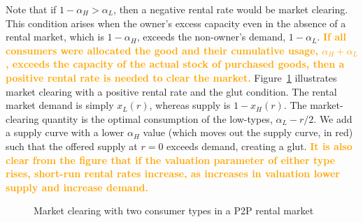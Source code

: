 \documentclass[11pt]{article}
\newcommand{\important}[1]{\textcolor{orange}{\textbf{#1}}}
\newcommand{\important}[1]{#1}
\begin{document}
Note that if $1-\alpha_H > \alpha_L$, then a negative rental rate would be market clearing. 
This condition arises when the owner's excess capacity even in the
absence of a rental market, which is $1-\alpha_H$, exceeds the non-owner's demand, $1-\alpha_L$.
\important{If all consumers were allocated the good and their cumulative usage, $\alpha_H + \alpha_L$, exceeds the capacity of the actual stock of purchased goods, then a positive rental rate is needed to clear the market.}
Figure~\ref{fig:market_clearing} illustrates market clearing with a positive rental rate and the glut condition. 
The rental market demand is simply $x_L(r)$, whereas supply is $1-x_H(r)$. 
The market-clearing quantity is the optimal consumption of the low-types, $\alpha_L - r/2$. 
We add a supply curve with a lower $\alpha_H$ value (which moves out the supply curve, in red) such that the offered supply at $r = 0$ exceeds demand, creating a glut.  
\important{It is also clear from the figure that if the valuation parameter of either type rises, short-run rental rates increase, as increases in valuation lower supply and increase demand.} 
 
\newcommand*{\alphaH}{0.80}%
\newcommand*{\alphaL}{0.50}%
\newcommand*{\alphaHp}{0.40}
\pgfmathsetmacro{\r}{-1 + \alphaH + \alphaL}%
\pgfmathsetmacro{\Q}{\alphaL - \r/2}
\begin{figure} 
\caption{Market clearing with two consumer types in a P2P rental market} 
\label{fig:market_clearing} 
\begin{center}
\end{center}
\end{figure} 
\end{document}
